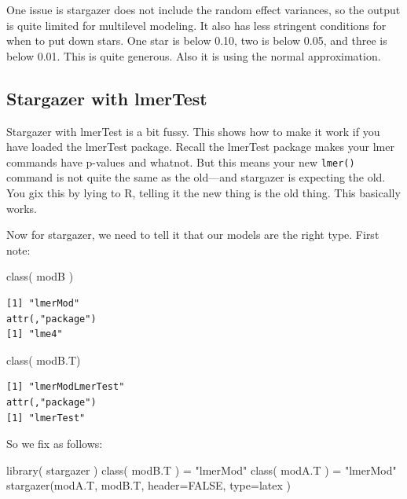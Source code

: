 \documentclass[
  letterpaper,
  DIV=11,
  numbers=noendperiod]{scrreprt}
\newenvironment{Shaded}{\begin{snugshade}}{\end{snugshade}}
\newcommand{\AttributeTok}[1]{\textcolor[rgb]{0.49,0.56,0.16}{#1}}
\newcommand{\ConstantTok}[1]{\textcolor[rgb]{0.53,0.00,0.00}{#1}}
\newcommand{\FunctionTok}[1]{\textcolor[rgb]{0.02,0.16,0.49}{#1}}
\newcommand{\NormalTok}[1]{\textcolor[rgb]{0.00,0.44,0.13}{#1}}
\newcommand{\OtherTok}[1]{\textcolor[rgb]{0.00,0.44,0.13}{#1}}
\newcommand{\StringTok}[1]{\textcolor[rgb]{0.25,0.44,0.63}{#1}}
\begin{document}
One issue is stargazer does not include the random effect variances, so
the output is quite limited for multilevel modeling. It also has less
stringent conditions for when to put down stars. One star is below 0.10,
two is below 0.05, and three is below 0.01. This is quite generous. Also
it is using the normal approximation.

\hypertarget{stargazer-with-lmertest}{%
\subsection{Stargazer with lmerTest}\label{stargazer-with-lmertest}}

Stargazer with lmerTest is a bit fussy. This shows how to make it work
if you have loaded the lmerTest package. Recall the lmerTest package
makes your lmer commands have p-values and whatnot. But this means your
new \texttt{lmer()} command is not quite the same as the old---and
stargazer is expecting the old. You gix this by lying to R, telling it
the new thing is the old thing. This basically works.

Now for stargazer, we need to tell it that our models are the right
type. First note:

\begin{Shaded}
\begin{Highlighting}[]
\FunctionTok{class}\NormalTok{( modB )}
\end{Highlighting}
\end{Shaded}

\begin{verbatim}
[1] "lmerMod"
attr(,"package")
[1] "lme4"
\end{verbatim}

\begin{Shaded}
\begin{Highlighting}[]
\FunctionTok{class}\NormalTok{( modB.T)}
\end{Highlighting}
\end{Shaded}

\begin{verbatim}
[1] "lmerModLmerTest"
attr(,"package")
[1] "lmerTest"
\end{verbatim}

So we fix as follows:

\begin{Shaded}
\begin{Highlighting}[]
\FunctionTok{library}\NormalTok{( stargazer )}
\FunctionTok{class}\NormalTok{( modB.T ) }\OtherTok{=} \StringTok{"lmerMod"} 
\FunctionTok{class}\NormalTok{( modA.T ) }\OtherTok{=} \StringTok{"lmerMod"} 
\FunctionTok{stargazer}\NormalTok{(modA.T, modB.T, }\AttributeTok{header=}\ConstantTok{FALSE}\NormalTok{, }\AttributeTok{type=}\StringTok{\textquotesingle{}latex\textquotesingle{}}\NormalTok{ )}
\end{Highlighting}
\end{Shaded}
\end{document}
